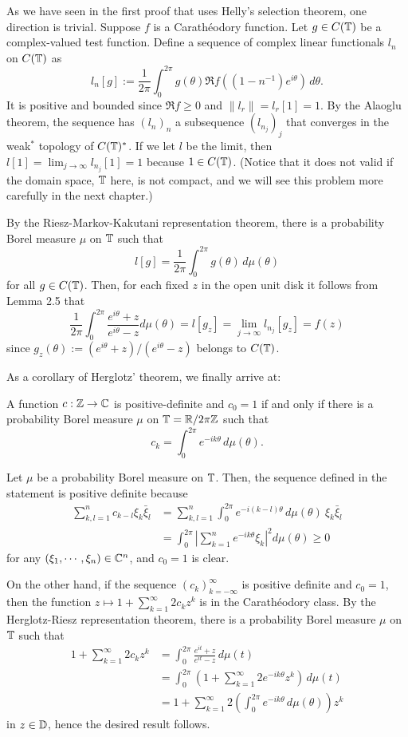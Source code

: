 \documentclass[a4paper]{article}
\begin{document}
\begin{pf}
As we have seen in the first proof that uses Helly's selection theorem, one direction is trivial.
Suppose $f$ is a Carath\'eodory function.
Let $g\in C(\mathbb{T})$ be a complex-valued test function.
Define a sequence of complex linear functionals $l_n$ on $C(\mathbb{T})$ as
\[l_n[g]:=\frac1{2\pi}\int_0^{2\pi}g(\theta)\Re f((1-n^{-1})e^{i\theta})\,d\theta.\]
It is positive and bounded since $\Re f\ge0$ and $\|l_r\|=l_r[1]=1$.
By the Alaoglu theorem, the sequence has $(l_n)_n$ a subsequence $(l_{n_j})_j$ that converges in the weak$^*$ topology of $C(\mathbb{T})^*$.
If we let $l$ be the limit, then $l[1]=\lim_{j\to\infty}l_{n_j}[1]=1$ because $1\in C(\mathbb{T})$.
(Notice that it does not valid if the domain space, $\mathbb{T}$ here, is not compact, and we will see this problem more carefully in the next chapter.)

By the Riesz-Markov-Kakutani representation theorem, there is a probability Borel measure $\mu$ on $\mathbb{T}$ such that
\[l[g]=\frac1{2\pi}\int_0^{2\pi}g(\theta)\,d\mu(\theta)\]
for all $g\in C(\mathbb{T})$.
Then, for each fixed $z$ in the open unit disk it follows from Lemma 2.5 that
\[\frac1{2\pi}\int_0^{2\pi}\frac{e^{i\theta}+z}{e^{i\theta}-z}d\mu(\theta)=l[g_z]=\lim_{j\to\infty}l_{n_j}[g_z]=f(z)\]
since $g_z(\theta):=(e^{i\theta}+z)/(e^{i\theta}-z)$ belongs to $C(\mathbb{T})$.
\end{pf}

As a corollary of Herglotz' theorem, we finally arrive at:

\begin{cor}
A function $c:\mathbb{Z}\to\mathbb{C}$ is positive-definite and $c_0=1$ if and only if there is a probability Borel measure $\mu$ on $\mathbb{T}=\mathbb{R}/2\pi\mathbb{Z}$ such that
\[c_k=\int_0^{2\pi}e^{-ik\theta}\,d\mu(\theta).\]
\end{cor}
\begin{pf}
Let $\mu$ be a probability Borel measure on $\mathbb{T}$.
Then, the sequence defined in the statement is positive definite because
\begin{align*}
\sum_{k,l=1}^nc_{k-l}\xi_k\bar\xi_l
&=\sum_{k,l=1}^n\int_0^{2\pi}e^{-i(k-l)\theta}\,d\mu(\theta)\ \xi_k\bar\xi_l\\
&=\int_0^{2\pi}\left|\sum_{k=1}^ne^{-ik\theta}\xi_k\right|^2d\mu(\theta)\ge0
\end{align*}
for any $(\xi_1,\cdots,\xi_n)\in\mathbb{C}^n$, and $c_0=1$ is clear.

On the other hand, if the sequence $(c_k)_{k=-\infty}^\infty$ is positive definite and $c_0=1$, then the function $z\mapsto1+\sum_{k=1}^\infty2c_kz^k$ is in the Carath\'eodory class.
By the Herglotz-Riesz representation theorem, there is a probability Borel measure $\mu$ on $\mathbb{T}$ such that
\begin{align*}
1+\sum_{k=1}^\infty2c_kz^k
&=\int_0^{2\pi}\frac{e^{it}+z}{e^{it}-z}\,d\mu(t)\\
&=\int_0^{2\pi}\left(1+\sum_{k=1}^\infty2e^{-ik\theta}z^k\right)\,d\mu(t)\\
&=1+\sum_{k=1}^\infty2\left(\int_0^{2\pi}e^{-ik\theta}\,d\mu(\theta)\right)z^k
\end{align*}
in $z\in\mathbb{D}$, hence the desired result follows.
\end{pf}
\end{document}
